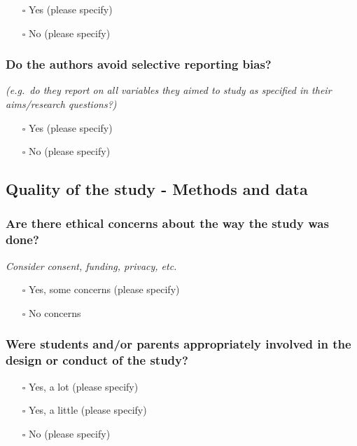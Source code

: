 \documentclass[
  doc, a4paper]{apa7}
\providecommand{\tightlist}{%
  \setlength{\itemsep}{0pt}\setlength{\parskip}{0pt}}
\begin{document}
\begin{itemize}
\tightlist
\item[$\square$]
  Yes (please specify)
\item[$\square$]
  No (please specify)
\end{itemize}

\subsubsection{Do the authors avoid selective reporting bias?}\label{do-the-authors-avoid-selective-reporting-bias}

\emph{(e.g.~do they report on all variables they aimed to study as specified in their aims/research questions?)}

\begin{itemize}
\tightlist
\item[$\square$]
  Yes (please specify)
\item[$\square$]
  No (please specify)
\end{itemize}

\subsection{Quality of the study - Methods and data}\label{quality-of-the-study---methods-and-data}

\subsubsection{Are there ethical concerns about the way the study was done?}\label{are-there-ethical-concerns-about-the-way-the-study-was-done}

\emph{Consider consent, funding, privacy, etc.}

\begin{itemize}
\tightlist
\item[$\square$]
  Yes, some concerns (please specify)
\item[$\square$]
  No concerns
\end{itemize}

\subsubsection{Were students and/or parents appropriately involved in the design or conduct of the study?}\label{were-students-andor-parents-appropriately-involved-in-the-design-or-conduct-of-the-study}

\begin{itemize}
\tightlist
\item[$\square$]
  Yes, a lot (please specify)
\item[$\square$]
  Yes, a little (please specify)
\item[$\square$]
  No (please specify)
\end{itemize}
\end{document}
